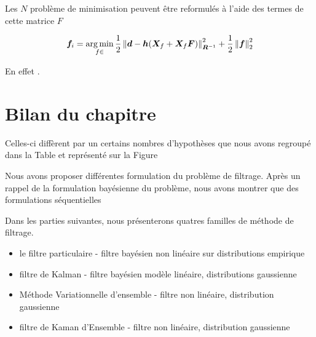 Les $N$ problème de minimisation peuvent être reformulés à l'aide des termes de cette matrice $F$

\begin{equation*}
    \bm f_i = \operatorname*{arg\,min}_{f \in } \frac12 \left\lVert \bm d - \bm h(\bm{X}_f + \bm{X}_f \bm{F}) \right\rVert^2_{\bm R^{-1}} + \frac12 \left\lVert \bm f \right\rVert_2^2
\end{equation*}

En effet .

\section{Bilan du chapitre}

Celles-ci diffèrent par un certains nombres d'hypothèses que nous avons regroupé dans la Table et représenté sur la Figure

Nous avons proposer différentes formulation du problème de filtrage. Après un rappel de la formulation bayésienne du problème, nous avons montrer que des formulations séquentielles

Dans les parties suivantes, nous présenterons quatres familles de méthode de filtrage.

\begin{itemize}
    \item le filtre particulaire - filtre bayésien non linéaire sur distributions empirique
    \item filtre de Kalman - filtre bayésien modèle linéaire, distributions gaussienne
    \item Méthode Variationnelle d'ensemble - filtre non linéaire, distribution gaussienne
    \item filtre de Kaman d'Ensemble - filtre non linéaire, distribution gaussienne

\end{itemize}

